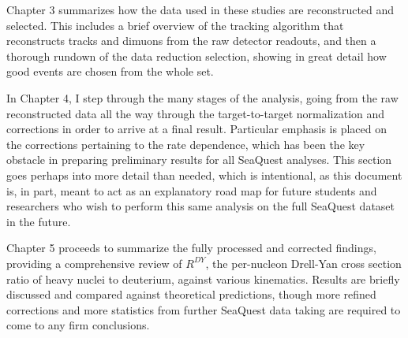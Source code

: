 \documentclass[edeposit,fullpage]{uiucthesis2009}
\begin{document}
Chapter 3 summarizes how the data used in these studies are reconstructed and selected. This includes a brief overview of the tracking algorithm that reconstructs tracks and dimuons from the raw detector readouts, and then a thorough rundown of the data reduction selection, showing in great detail how good events are chosen from the whole set.

In Chapter 4, I step through the many stages of the analysis, going from the raw reconstructed data all the way through the target-to-target normalization and corrections in order to arrive at a final result. Particular emphasis is placed on the corrections pertaining to the rate dependence, which has been the key obstacle in preparing preliminary results for all SeaQuest analyses. This section goes perhaps into more detail than needed, which is intentional, as this document is, in part, meant to act as an explanatory road map for future students and researchers who wish to perform this same analysis on the full SeaQuest dataset in the future.

Chapter 5 proceeds to summarize the fully processed and corrected findings, providing a comprehensive review of $R^{DY}$, the per-nucleon Drell-Yan cross section ratio of heavy nuclei to deuterium, against various kinematics. Results are briefly discussed and compared against theoretical predictions, though more refined corrections and more statistics from further SeaQuest data taking are required to come to any firm conclusions.



%
%



%


\appendix



\backmatter



\end{document}

